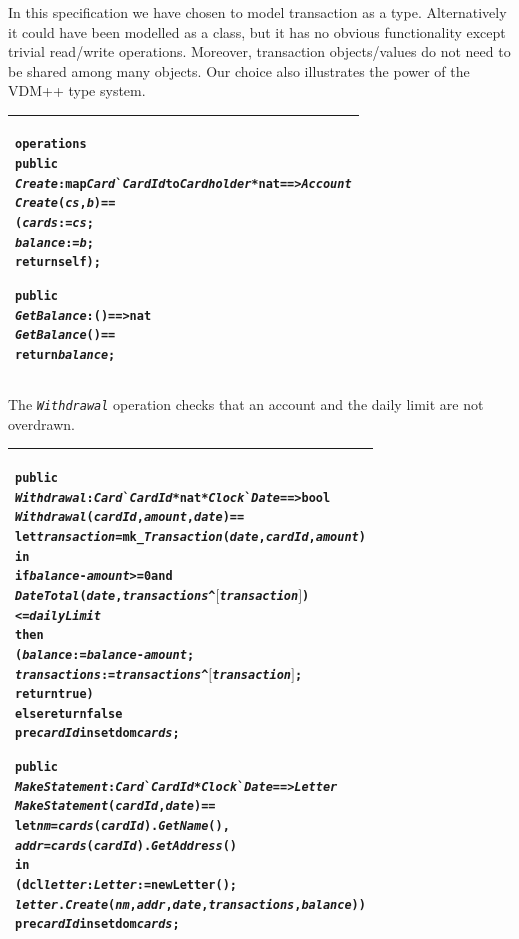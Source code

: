 \documentclass[\pformat,12pt,twoside]{article}
\newenvironment{VDMgray}%
{\begin{tabular}{|G|}\hline\small\begin{alltt}}%
{\end{alltt}\normalsize\\
 \hline\end{tabular}}
\begin{document}
In this specification we have chosen to model transaction as 
a type. Alternatively it could have been modelled as a class, 
but it has no obvious functionality except trivial read/write 
operations. Moreover, transaction objects/values do not need 
to be shared among many objects. Our choice also illustrates 
the power of the VDM++ type system.

\begin{VDMgray}
\textbf{operations}
 \textbf{public}
 \textit{Create} : \textbf{map} \textit{Card}\`{}\textit{CardId} \textbf{to} \textit{Cardholder} * \textbf{nat} ==\texttt{>} \textit{Account}
 \textit{Create}(\textit{cs},\textit{b}) ==
   (\textit{cards} := \textit{cs};
    \textit{balance} := \textit{b};
    \textbf{return} \textbf{self});

 \textbf{public}
 \textit{GetBalance} : () ==\texttt{>} \textbf{nat}
 \textit{GetBalance}() ==
   \textbf{return} \textit{balance};
\end{VDMgray}


The \texttt{\emph{Withdrawal}} operation checks that an account and the daily 
limit are not overdrawn. 

\begin{VDMgray}
 \textbf{public}
 \textit{Withdrawal} : \textit{Card}\`{}\textit{CardId} * \textbf{nat} * \textit{Clock}\`{}\textit{Date} ==\texttt{>} \textbf{bool}
 \textit{Withdrawal}(\textit{cardId},\textit{amount},\textit{date}) ==
   \textbf{let} \textit{transaction} = \textbf{mk\_}\textit{Transaction}(\textit{date},\textit{cardId},\textit{amount})
   \textbf{in}
     \textbf{if} \textit{balance} - \textit{amount} \texttt{>}= 0 \textbf{and}
        \textit{DateTotal}(\textit{date},\textit{transactions}{\textasciicircum}\ensuremath{[}\textit{transaction}\ensuremath{]}) 
        \texttt{<}= \textit{dailyLimit}
     \textbf{then}
        (\textit{balance} := \textit{balance} - \textit{amount};
         \textit{transactions} := \textit{transactions} {\textasciicircum} \ensuremath{[}\textit{transaction}\ensuremath{]};
         \textbf{return} \textbf{true})
     \textbf{else}{\color{color16} \textbf{return}} {\color{color16} \textbf{false}}
 \textbf{pre} \textit{cardId} \textbf{in set} \textbf{dom} \textit{cards};

 \textbf{public}
 \textit{MakeStatement} : \textit{Card}\`{}\textit{CardId} * \textit{Clock}\`{}\textit{Date} ==\texttt{>} \textit{Letter}
 \textit{MakeStatement}(\textit{cardId},\textit{date}) ==
   \textbf{let} \textit{nm} = \textit{cards}(\textit{cardId}).\textit{GetName}(),
       \textit{addr} = \textit{cards}(\textit{cardId}).\textit{GetAddress}()
   \textbf{in}
     (\textbf{dcl} \textit{letter} : \textit{Letter} := \textbf{new} Letter();
      \textit{letter}.\textit{Create}(\textit{nm},\textit{addr},\textit{date},\textit{transactions},\textit{balance}))
 \textbf{pre} \textit{cardId} \textbf{in set} \textbf{dom} \textit{cards};
\end{VDMgray}
\end{document}
